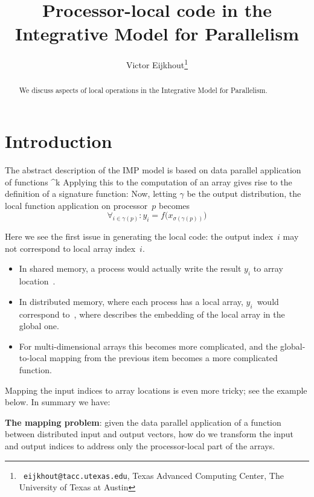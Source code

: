 \documentclass[11pt,fleqn,preprint]{impreport}
\title[IMP local code]{Processor-local code in the Integrative Model for Parallelism}
\author[Eijkhout]{Victor Eijkhout\thanks{{\tt
      eijkhout@tacc.utexas.edu}, Texas Advanced Computing Center, The
    University of Texas at Austin}}
\begin{document}
\maketitle

\begin{abstract}
We discuss aspects of local operations in the Integrative Model for Parallelism.
\end{abstract}

\acresetall

\section{Introduction}

The abstract description of the IMP model is based on data parallel application of functions
%
  { \equiv  {}^k\rightarrow {}}
%
Applying this to the computation of an array gives rise to the
definition of a signature function:
%
%
%
Now, letting $\gamma$ be the output distribution, the local function
application on processor~$p$ becomes
\[ \forall_{i\in\gamma(p)}\colon y_i=f\bigl( x_{\sigma(\gamma(p))} \bigr) \]

Here we see the first issue in generating the local code: the output
index~$i$ may not correspond to local array index~$i$.
\begin{itemize}
\item In shared memory, a process would actually write the result
  $y_i$ to array location~.
\item In distributed memory, where each process has a local array,
  $y_i$~would correspond to~, where 
  describes the embedding of the local array in the global one.
\item For multi-dimensional arrays this becomes more complicated, and
  the global-to-local mapping from the previous item becomes a more
  complicated function.
\end{itemize}

Mapping the input indices to array locations is even more tricky; see
the example below. In summary we have:
\begin{framed}
  \textbf{The mapping problem}: given the data parallel application of
  a function between distributed input and output vectors, how do we
  transform the input and output indices to address only the
  processor-local part of the arrays.
\end{framed}
\end{document}
